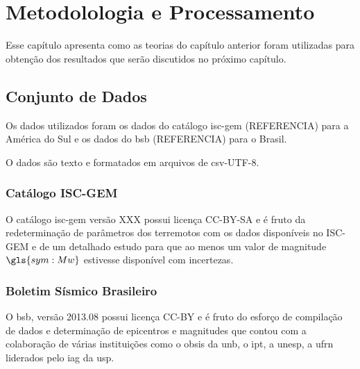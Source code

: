 \chapter{Metodolologia e Processamento}
\label{cap:processamento}

Esse capítulo apresenta como as teorias do capítulo anterior foram utilizadas para obtenção 
dos resultados que serão discutidos no próximo capítulo.

\section{Conjunto de Dados}
\label{sec:dados}

Os dados utilizados foram os dados do catálogo \gls{isc}-\gls{gem} (REFERENCIA) 
para a América do Sul e 
os dados do \gls{bsb} (REFERENCIA) para o Brasil.

O dados são texto e formatados em arquivos de \gls{csv}-UTF-8.

\subsection{Catálogo ISC-GEM}
\label{sec:data_source}

O catálogo \gls{isc}-\gls{gem} versão XXX possui licença CC-BY-SA e é fruto da redeterminação de parâmetros
dos terremotos com os dados disponíveis no ISC-GEM e de um detalhado estudo para que ao menos um valor de
magnitude $\gls{sym:Mw}$ estivesse disponível com incertezas.

\subsection{Boletim Sísmico Brasileiro}
\label{sec:data_source2}

O \gls{bsb}, versão 2013.08 possui licença CC-BY e é fruto do esforço de compilação de
dados e determinação de epicentros e magnitudes que contou com a colaboração de várias instituições
como o \gls{obsis} da \gls{unb}, o \gls{ipt}, a \gls{unesp}, a \gls{ufrn} liderados pelo \gls{iag} da \gls{usp}.




